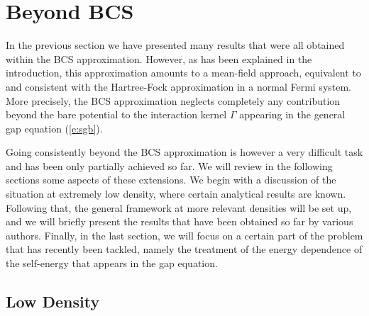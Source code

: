 \documentclass[runningheads]{svmult}
\def\sig{\Sigma}
\def\gam{\Gamma}
\begin{document}
\section{Beyond BCS}

In the previous section we have presented many results that were all obtained 
within the BCS approximation. 
However, as has been explained in the introduction, 
this
approximation amounts to a mean-field approach, equivalent to and consistent 
with the Hartree-Fock approximation in a normal Fermi system.
More precisely, the BCS approximation neglects completely 
any contribution beyond the bare potential to the interaction kernel $\gam$
appearing in the general gap equation (\ref{e:sgb}).

Going consistently beyond the BCS approximation is however a very difficult
task and has been only partially achieved so far.
We will review in the following sections some aspects of these extensions.
We begin with a discussion of the situation at extremely low density, where
certain analytical results are known.
Following that, the general framework at more relevant densities will be 
set up, and we will briefly present the results that have been obtained 
so far by various authors.
Finally, in the last section, we will focus on a certain part of the 
problem that has recently been tackled, namely the treatment of  
the energy dependence of the self-energy that appears in the gap equation.

\subsection{Low Density}
\label{s:ldl}
\end{document}
